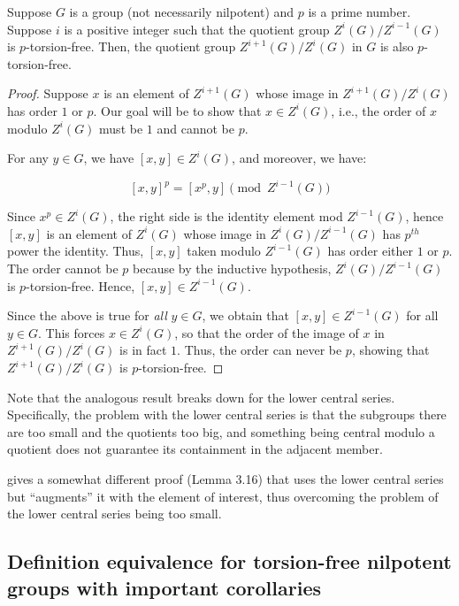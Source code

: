 \begin{lemma}\label{lemma:ucs-torsion-free}
  Suppose $G$ is a group (not necessarily nilpotent) and $p$ is a
  prime number. Suppose $i$ is a positive integer such that the
  quotient group $Z^i(G)/Z^{i-1}(G)$ is $p$-torsion-free. Then, the
  quotient group $Z^{i+1}(G)/Z^i(G)$ in $G$ is also $p$-torsion-free.
\end{lemma}

\begin{proof}
  Suppose $x$ is an element of $Z^{i+1}(G)$ whose image in
  $Z^{i+1}(G)/Z^i(G)$ has order $1$ or $p$. Our goal will be to show
  that $x \in Z^i(G)$, i.e., the order of $x$ modulo $Z^i(G)$ must be
  $1$ and cannot be $p$.

  For any $y \in G$, we have $[x,y] \in Z^i(G)$, and moreover, we
  have:

  $$[x,y]^p = [x^p,y] \pmod{Z^{i-1}(G)}$$

  Since $x^p \in Z^i(G)$, the right side is the identity element mod
  $Z^{i-1}(G)$, hence $[x,y]$ is an element of $Z^i(G)$ whose image in
  $Z^i(G)/Z^{i-1}(G)$ has $p^{th}$ power the identity. Thus, $[x,y]$
  taken modulo $Z^{i-1}(G)$ has order either $1$ or $p$. The order
  cannot be $p$ because by the inductive hypothesis,
  $Z^i(G)/Z^{i-1}(G)$ is $p$-torsion-free. Hence, $[x,y] \in Z^{i-1}(G)$.

  Since the above is true for {\em all} $y \in G$, we obtain that
  $[x,y] \in Z^{i-1}(G)$ for all $y \in G$. This forces $x \in
  Z^i(G)$, so that the order of the image of $x$ in
  $Z^{i+1}(G)/Z^i(G)$ is in fact $1$. Thus, the order can never be
  $p$, showing that $Z^{i+1}(G)/Z^i(G)$ is $p$-torsion-free.
\end{proof}

Note that the analogous result breaks down for the lower central
series. Specifically, the problem with the lower central series is
that the subgroups there are too small and the quotients too big, and
something being central modulo a quotient does not guarantee its
containment in the adjacent member.

\cite{Khukhro} gives a somewhat different proof (Lemma 3.16) that uses
the lower central series but ``augments'' it with the element of
interest, thus overcoming the problem of the lower central series being too small.

\subsection{Definition equivalence for torsion-free nilpotent groups with important corollaries}

